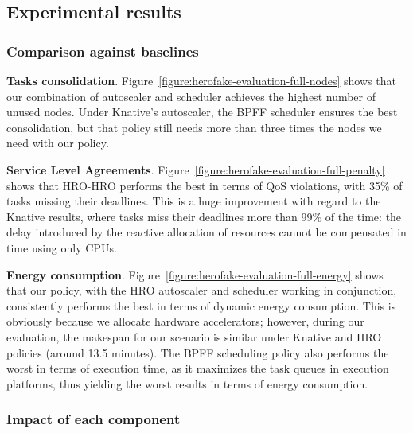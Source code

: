\subsection{Experimental results}

\subsubsection{Comparison against baselines}

\textbf{Tasks consolidation}. Figure~\ref{figure:herofake-evaluation-full-nodes} shows that our combination of autoscaler and scheduler achieves the highest number of unused nodes. Under Knative's autoscaler, the BPFF scheduler ensures the best consolidation, but that policy still needs more than three times the nodes we need with our policy.%

\textbf{Service Level Agreements}. Figure~\ref{figure:herofake-evaluation-full-penalty} shows that HRO-HRO performs the best in terms of QoS violations, with 35\% of tasks missing their deadlines. This is a huge improvement with regard to the Knative results, where tasks miss their deadlines more than 99\% of the time: the delay introduced by the reactive allocation of resources cannot be compensated in time using only CPUs.

\textbf{Energy consumption}. Figure~\ref{figure:herofake-evaluation-full-energy} shows that our policy, with the HRO autoscaler and scheduler working in conjunction, consistently performs the best in terms of dynamic energy consumption. This is obviously because we allocate hardware accelerators; however, during our evaluation, the makespan for our scenario is similar under Knative and HRO policies (around 13.5 minutes). The BPFF scheduling policy also performs the worst in terms of execution time, as it maximizes the task queues in execution platforms, thus yielding the worst results in terms of energy consumption.


\subsubsection{Impact of each component}

